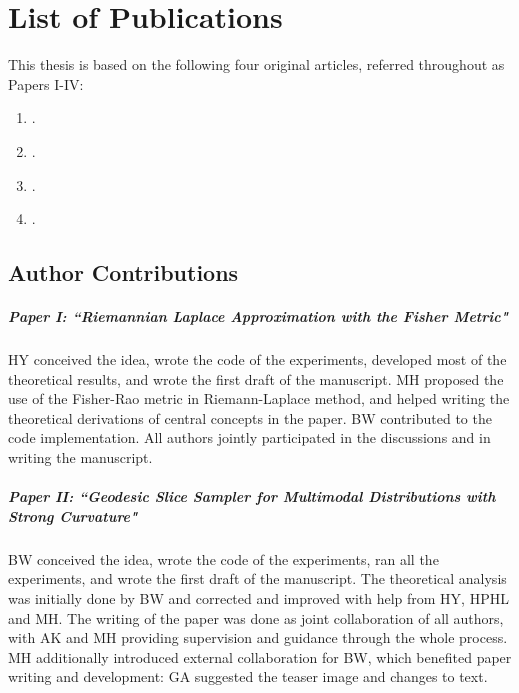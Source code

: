 \chapter*{List of Publications}
This thesis is based on the following four original articles, referred throughout as Papers I-IV:
\begin{enumerate}[label=\textbf{\Roman*:}]
    \item {}.
    \item {}.
    \item {}.
    \item {}.
\end{enumerate}

\newpage

\section*{Author Contributions}

\paragraph{Paper I: ``Riemannian Laplace Approximation with the Fisher Metric"}
HY conceived the idea, wrote the code of the experiments, developed most of the theoretical results, and wrote the first draft of the manuscript. MH proposed the use of the Fisher-Rao metric in Riemann-Laplace method, and helped writing the theoretical derivations of central concepts in the paper. BW contributed to the code implementation. All authors jointly participated in the  discussions and in writing the manuscript. 

\paragraph{Paper II: ``Geodesic Slice Sampler for Multimodal Distributions with Strong Curvature"}
BW conceived the idea, wrote the code of the experiments, ran all the experiments, and wrote the first draft of the manuscript. The theoretical analysis was  initially done by BW and corrected and improved  with help from HY, HPHL and MH. The writing of the paper was done as joint collaboration of all authors, with AK and MH providing supervision and guidance through the whole process. MH additionally introduced external collaboration for BW, which benefited paper writing and development: GA suggested the teaser image and changes to text. 

